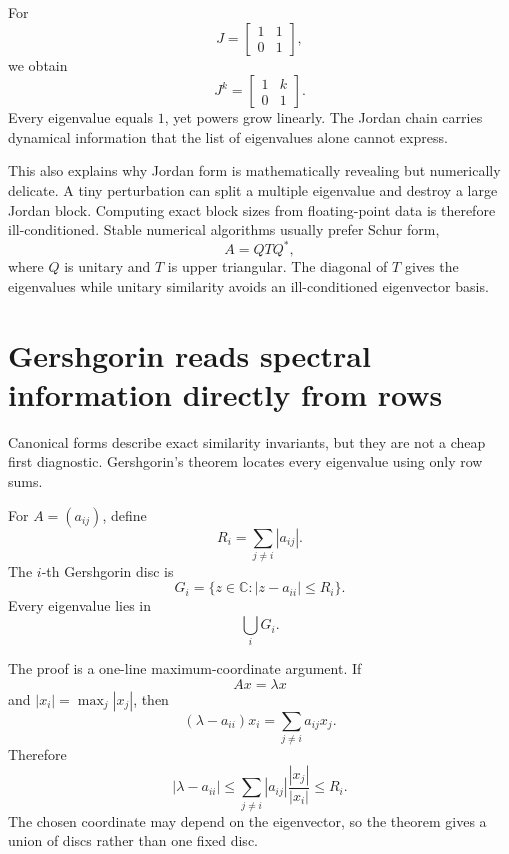 For
\[
  J=
  \begin{bmatrix}
    1&1\\
    0&1
  \end{bmatrix},
\]
we obtain
\[
  J^k=
  \begin{bmatrix}
    1&k\\
    0&1
  \end{bmatrix}.
\]
Every eigenvalue equals \(1\), yet powers grow linearly.  The Jordan chain carries dynamical information that the list of eigenvalues alone cannot express.

This also explains why Jordan form is mathematically revealing but numerically delicate.  A tiny perturbation can split a multiple eigenvalue and destroy a large Jordan block.  Computing exact block sizes from floating-point data is therefore ill-conditioned.  Stable numerical algorithms usually prefer Schur form,
\[
  A=QTQ^*,
\]
where \(Q\) is unitary and \(T\) is upper triangular.  The diagonal of \(T\) gives the eigenvalues while unitary similarity avoids an ill-conditioned eigenvector basis.

\section{Gershgorin reads spectral information directly from rows}

Canonical forms describe exact similarity invariants, but they are not a cheap first diagnostic.  Gershgorin's theorem locates every eigenvalue using only row sums.

For \(A=(a_{ij})\), define
\[
  R_i=\sum_{j\ne i}|a_{ij}|.
\]
The \(i\)-th Gershgorin disc is
\[
  G_i=\{z\in\mathbb C:|z-a_{ii}|\le R_i\}.
\]
Every eigenvalue lies in
\[
  \bigcup_iG_i.
\]

The proof is a one-line maximum-coordinate argument.  If
\[
  Ax=\lambda x
\]
and \(|x_i|=\max_j|x_j|\), then
\[
  (\lambda-a_{ii})x_i
  =\sum_{j\ne i}a_{ij}x_j.
\]
Therefore
\[
  |\lambda-a_{ii}|
  \le
  \sum_{j\ne i}|a_{ij}|
  \frac{|x_j|}{|x_i|}
  \le R_i.
\]
The chosen coordinate may depend on the eigenvector, so the theorem gives a union of discs rather than one fixed disc.

